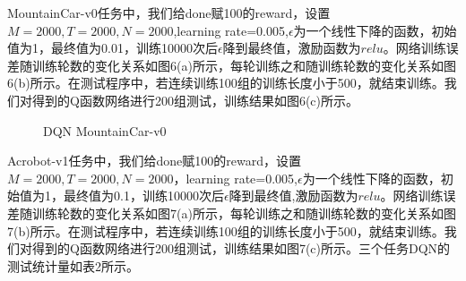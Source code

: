 \documentclass[a4paper,UTF8]{article}
\theoremstyle{definition}
\begin{document}
	MountainCar-v0任务中，我们给done赋100的reward，设置$M=2000,T=2000,N=2000$,learning rate=0.005,$\epsilon$为一个线性下降的函数，初始值为1，最终值为0.01，训练10000次后$\epsilon$降到最终值，激励函数为$relu$。网络训练误差随训练轮数的变化关系如图6(a)所示，每轮训练之和随训练轮数的变化关系如图6(b)所示。在测试程序中，若连续训练100组的训练长度小于500，就结束训练。我们对得到的Q函数网络进行200组测试，训练结果如图6(c)所示。


\begin{figure}[!h]
	\centering
	\caption{DQN MountainCar-v0}

\end{figure}

	Acrobot-v1任务中，我们给done赋100的reward，设置$M=2000,T=2000,N=2000$，learning rate=0.005,$\epsilon$为一个线性下降的函数，初始值为1，最终值为0.1，训练10000次后$\epsilon$降到最终值,激励函数为$relu$。网络训练误差随训练轮数的变化关系如图7(a)所示，每轮训练之和随训练轮数的变化关系如图7(b)所示。在测试程序中，若连续训练100组的训练长度小于500，就结束训练。我们对得到的Q函数网络进行200组测试，训练结果如图7(c)所示。三个任务DQN的测试统计量如表2所示。
\end{document}
